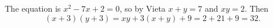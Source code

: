 The equation is $x^2-7x+2=0$, so by Vieta $x+y=7$ and $xy=2$. Then
\[(x+3)(y+3)=xy+3(x+y)+9=2+21+9=\boxed{32}.\]
